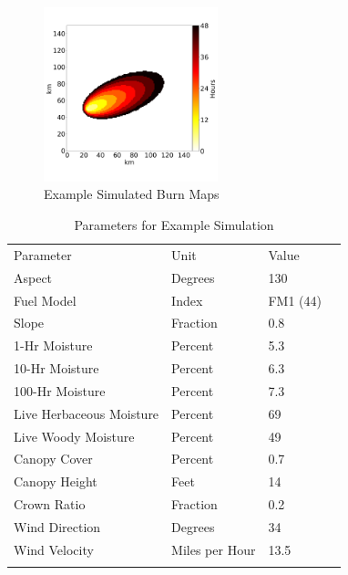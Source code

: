 \documentclass[smallcondensed]{svjour3}     %
\begin{document}
\begin{figure}[htb]
\centering
  \includegraphics[width=0.45\textwidth]{exampleFirePerimiter0.png}
\caption{Example Simulated Burn Maps}
\label{fig:firePerimeters}       %
\end{figure}

\begin{table}[htb]
\centering
\caption{Parameters for Example Simulation}
\label{tab:paramsExample}       %
\begin{tabular}{llll}
\hline\noalign{\smallskip}
Parameter & Unit & Value \\
\noalign{\smallskip}\hline\noalign{\smallskip}
Aspect & Degrees & 130 \\
Fuel Model & Index & FM1 (44) \\
Slope & Fraction & 0.8 \\
\hline
1-Hr Moisture & Percent & 5.3 \\
10-Hr Moisture & Percent & 6.3 \\
100-Hr Moisture & Percent & 7.3 \\
Live Herbaceous Moisture & Percent & 69 \\
Live Woody Moisture & Percent & 49 \\
\hline
Canopy Cover & Percent & 0.7 \\
Canopy Height & Feet & 14 \\
Crown Ratio & Fraction & 0.2 \\
\hline
Wind Direction & Degrees & 34 \\
Wind Velocity & Miles per Hour & 13.5 \\
\noalign{\smallskip}\hline
\end{tabular}
\end{table}
\end{document}
